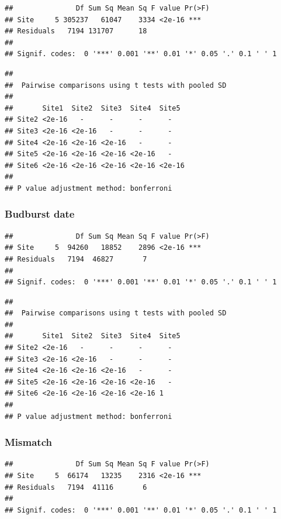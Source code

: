 \documentclass[12 pt]{article}
\begin{document}
\begin{verbatim}
##               Df Sum Sq Mean Sq F value Pr(>F)    
## Site     5 305237   61047    3334 <2e-16 ***
## Residuals   7194 131707      18                   
## 
## Signif. codes:  0 '***' 0.001 '**' 0.01 '*' 0.05 '.' 0.1 ' ' 1
\end{verbatim}

\begin{verbatim}
## 
##  Pairwise comparisons using t tests with pooled SD 
##  
##       Site1  Site2  Site3  Site4  Site5 
## Site2 <2e-16   -      -      -      -     
## Site3 <2e-16 <2e-16   -      -      -     
## Site4 <2e-16 <2e-16 <2e-16   -      -     
## Site5 <2e-16 <2e-16 <2e-16 <2e-16   -     
## Site6 <2e-16 <2e-16 <2e-16 <2e-16 <2e-16
## 
## P value adjustment method: bonferroni
\end{verbatim}

\subsubsection*{Budburst date}

\begin{verbatim}
##               Df Sum Sq Mean Sq F value Pr(>F)    
## Site     5  94260   18852    2896 <2e-16 ***
## Residuals   7194  46827       7                   
## 
## Signif. codes:  0 '***' 0.001 '**' 0.01 '*' 0.05 '.' 0.1 ' ' 1
\end{verbatim}

\begin{verbatim}
## 
##  Pairwise comparisons using t tests with pooled SD 
## 
##       Site1  Site2  Site3  Site4  Site5
## Site2 <2e-16   -      -      -      -    
## Site3 <2e-16 <2e-16   -      -      -    
## Site4 <2e-16 <2e-16 <2e-16   -      -    
## Site5 <2e-16 <2e-16 <2e-16 <2e-16   -    
## Site6 <2e-16 <2e-16 <2e-16 <2e-16 1    
## 
## P value adjustment method: bonferroni
\end{verbatim}

\subsubsection*{Mismatch}

\begin{verbatim}
##               Df Sum Sq Mean Sq F value Pr(>F)    
## Site     5  66174   13235    2316 <2e-16 ***
## Residuals   7194  41116       6                   
## 
## Signif. codes:  0 '***' 0.001 '**' 0.01 '*' 0.05 '.' 0.1 ' ' 1
\end{verbatim}
\end{document}
